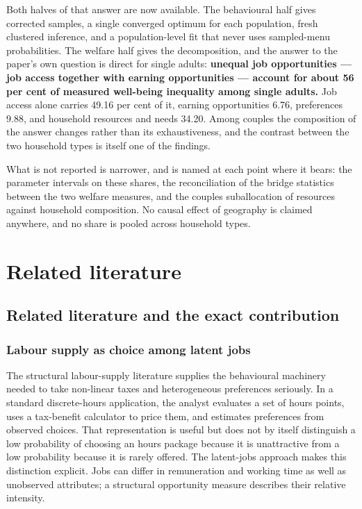 \documentclass[11pt,a4paper]{article}
\begin{document}
Both halves of that answer are now available. The behavioural half gives corrected samples, a single converged optimum for each population, fresh clustered inference, and a population-level fit that never uses sampled-menu probabilities. The welfare half gives the decomposition, and the answer to the paper's own question is direct for single adults: \textbf{unequal job opportunities --- job access together with earning opportunities --- account for about 56 per cent of measured well-being inequality among single adults.} Job access alone carries 49.16 per cent of it, earning opportunities 6.76, preferences 9.88, and household resources and needs 34.20. Among couples the composition of the answer changes rather than its exhaustiveness, and the contrast between the two household types is itself one of the findings.

What is not reported is narrower, and is named at each point where it bears: the parameter intervals on these shares, the reconciliation of the bridge statistics between the two welfare measures, and the couples suballocation of resources against household composition. No causal effect of geography is claimed anywhere, and no share is pooled across household types.

\section{Related literature}\label{related-literature}

\subsection{Related literature and the exact contribution}\label{related-literature-and-the-exact-contribution}

\subsubsection{Labour supply as choice among latent jobs}\label{labour-supply-as-choice-among-latent-jobs}

The structural labour-supply literature supplies the behavioural machinery needed to take non-linear taxes and heterogeneous preferences seriously. In a standard discrete-hours application, the analyst evaluates a set of hours points, uses a tax-benefit calculator to price them, and estimates preferences from observed choices. That representation is useful but does not by itself distinguish a low probability of choosing an hours package because it is unattractive from a low probability because it is rarely offered. The latent-jobs approach makes this distinction explicit. Jobs can differ in remuneration and working time as well as unobserved attributes; a structural opportunity measure describes their relative intensity.
\end{document}
